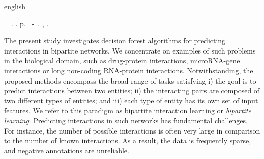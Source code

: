 \begin{resumo}[Abstract]
 \begin{otherlanguage*}{english}
	\begin{flushleft} 
		\setlength{\absparsep}{0pt} %
 		\SingleSpacing  		\imprimirautorabr~~\textbf{\imprimirtitleabstract}.	\imprimirdata.  \pageref{LastPage}p. 
		\imprimirtipotrabalhoabs~-~\imprimirinstituicao, \imprimirlocal, 	\imprimirdata. 
 	\end{flushleft}
	\OnehalfSpacing 
	
	The present study investigates decision forest algorithms for predicting interactions in bipartite networks.
	We concentrate on examples of such problems in the biological domain, such as drug-protein interactions, microRNA-gene interactions or long non-coding RNA-protein interactions.
	Notwithstanding, the proposed methods encompass
	the broad range of tasks satisfying i) the goal is to predict interactions between two entities; ii) the interacting pairs are composed of two different types of entities; and iii) each type of entity has its own set of input features. We refer to this paradigm as bipartite interaction learning or \emph{bipartite learning}.  %
	Predicting interactions in such networks has fundamental challenges. For instance, the number of possible interactions is often very large in comparison to the number of known interactions. As a result, the data is frequently sparse, and negative annotations are unreliable.

\end{otherlanguage*}
\end{resumo}
